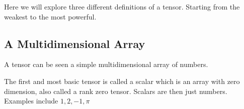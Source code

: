 Here we will explore three different definitions of a tensor. Starting from the weakest to the most powerful.

\subsection{A Multidimensional Array}
A tensor can be seen a simple multidimensional array of numbers.

The first and most basic tensor is called a scalar which is an array with zero dimension, also called a rank zero tensor. Scalars are then just numbers. Examples include $1,2,-1,\pi$
